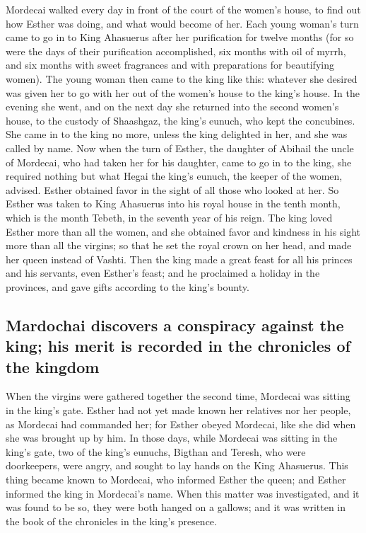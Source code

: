  Mordecai walked every day in front of the court of the
women's house, to find out how Esther was doing, and what would become
of her.  Each young woman's turn came to go in to King
Ahasuerus after her purification for twelve months (for so were the days
of their purification accomplished, six months with oil of myrrh, and
six months with sweet fragrances and with preparations for beautifying
women).  The young woman then came to the king like this:
whatever she desired was given her to go with her out of the women's
house to the king's house.  In the evening she went, and
on the next day she returned into the second women's house, to the
custody of Shaashgaz, the king's eunuch, who kept the concubines. She
came in to the king no more, unless the king delighted in her, and she
was called by name.  Now when the turn of Esther, the
daughter of Abihail the uncle of Mordecai, who had taken her for his
daughter, came to go in to the king, she required nothing but what Hegai
the king's eunuch, the keeper of the women, advised. Esther obtained
favor in the sight of all those who looked at her.  So
Esther was taken to King Ahasuerus into his royal house in the tenth
month, which is the month Tebeth, in the seventh year of his reign.
 The king loved Esther more than all the women, and she
obtained favor and kindness in his sight more than all the virgins; so
that he set the royal crown on her head, and made her queen instead of
Vashti.  Then the king made a great feast for all his
princes and his servants, even Esther's feast; and he proclaimed a
holiday in the provinces, and gave gifts according to the king's bounty.

\hypertarget{mardochai-discovers-a-conspiracy-against-the-king-his-merit-is-recorded-in-the-chronicles-of-the-kingdom}{%
\subsection{Mardochai discovers a conspiracy against the king; his merit
is recorded in the chronicles of the
kingdom}\label{mardochai-discovers-a-conspiracy-against-the-king-his-merit-is-recorded-in-the-chronicles-of-the-kingdom}}

 When the virgins were gathered together the second time,
Mordecai was sitting in the king's gate.  Esther had not
yet made known her relatives nor her people, as Mordecai had commanded
her; for Esther obeyed Mordecai, like she did when she was brought up by
him.  In those days, while Mordecai was sitting in the
king's gate, two of the king's eunuchs, Bigthan and Teresh, who were
doorkeepers, were angry, and sought to lay hands on the King Ahasuerus.
 This thing became known to Mordecai, who informed Esther
the queen; and Esther informed the king in Mordecai's name.
 When this matter was investigated, and it was found to
be so, they were both hanged on a gallows; and it was written in the
book of the chronicles in the king's presence.

